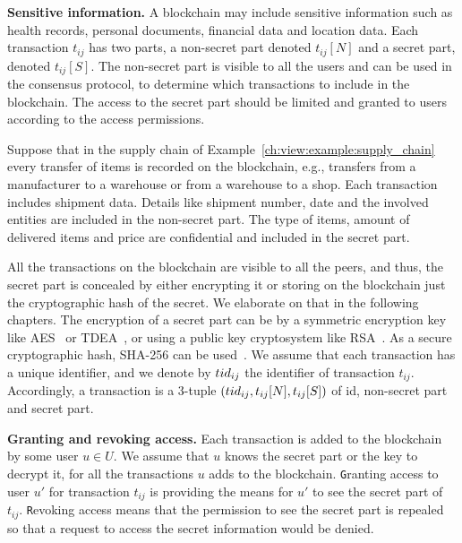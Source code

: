 \medskip
\noindent
\textbf{Sensitive information.} %
A blockchain may include sensitive information such as health records, personal documents, financial data and location data. Each transaction $t_{ij}$ has two parts, a non-secret part denoted $t_{ij}[N]$ and a secret part, denoted $t_{ij}[S]$. The non-secret part is visible to all the users and can be used in the consensus protocol, to determine which transactions to include in the blockchain. The access to the secret part should be limited and granted to users according to the access permissions. 
\begin{example}
Suppose that in the supply chain of Example~\ref{ch:view:example:supply_chain} every transfer of items is recorded on the blockchain, e.g., transfers from a manufacturer to a warehouse or from a warehouse to a shop. Each transaction includes shipment data. Details like shipment number, date and the involved entities are included in the non-secret part. The type of items, amount of delivered items and price are confidential and included in the secret part.
\end{example}

All the transactions on the blockchain are visible to all the peers, and thus, the secret part is concealed by either encrypting it or storing on the blockchain just the cryptographic hash of the secret. We elaborate on that in the following chapters.
The encryption of a secret part can be by a symmetric encryption key like AES~\cite{daemen2001reijndael} or TDEA~\cite{barker2017recommendation}, or using a public key cryptosystem like RSA~\cite{rivest1978method}. As a secure cryptographic hash, SHA-256 can be used~\cite{gueron2011sha}.  We assume that each transaction has a unique identifier, and we denote by ${tid\/}_{ij}$ the identifier of transaction $t_{ij}$. Accordingly, a transaction is a 3-tuple $({tid\/}_{ij}, t_{ij}[N], t_{ij}[S])$ of id, non-secret part and secret part.




\medskip
\noindent
\textbf{Granting and revoking access.}
Each transaction is added to the blockchain by some user $u\in U$. We assume that $u$ knows the secret part or the key to decrypt it, for all the transactions $u$ adds to the blockchain. {\texttt Granting access\/} to user $u'$ for transaction $t_{ij}$ is providing the means for $u'$ to see the secret part of $t_{ij}$. {\texttt Revoking access\/} means that the permission to see the secret part is repealed so that a request to access the secret information would be denied.

